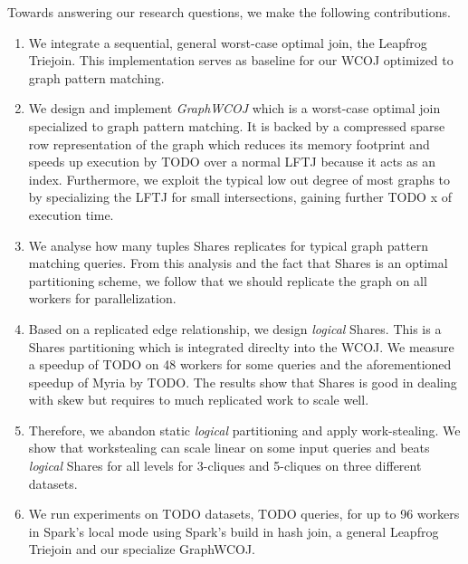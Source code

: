Towards answering our research questions, we make the following contributions.

\begin{enumerate}
    \item We integrate a sequential, general worst-case optimal join, the Leapfrog Triejoin.
      This implementation serves as baseline for our \textsc{WCOJ} optimized to graph pattern matching.
    \item We design and implement \textit{GraphWCOJ} which is a worst-case optimal join specialized to graph pattern matching.
       It is backed by a compressed sparse row representation of the graph which reduces its memory footprint and speeds up execution
       by TODO over a normal \textsc{LFTJ} because it acts as an index. %
       Furthermore, we exploit the typical low out degree of most graphs to by specializing the \textsc{LFTJ} for small intersections,
       gaining further TODO x of execution time. %
    \item We analyse how many tuples Shares replicates for typical graph pattern matching queries.
      From this analysis and the fact that Shares is an optimal partitioning scheme, we follow that we should replicate the graph
      on all workers for parallelization.
    \item Based on a replicated edge relationship, we design \textit{logical} Shares.
      This is a Shares partitioning which is integrated direclty into the \textsc{WCOJ}.
      We measure a speedup of TODO on 48 workers for some queries and the aforementioned speedup of Myria by TODO.
      The results show that Shares is good in dealing with skew but requires to much replicated work to scale well.
    \item Therefore, we abandon static \textit{logical} partitioning and apply work-stealing.
       We show that workstealing can scale linear on some input queries and beats \textit{logical} Shares for
       all levels for 3-cliques and 5-cliques on three different datasets.
    \item We run experiments on TODO datasets, TODO queries, for up to 96 workers in Spark's local mode using Spark's build in hash join,
       a general Leapfrog Triejoin and our specialize GraphWCOJ.
\end{enumerate}







